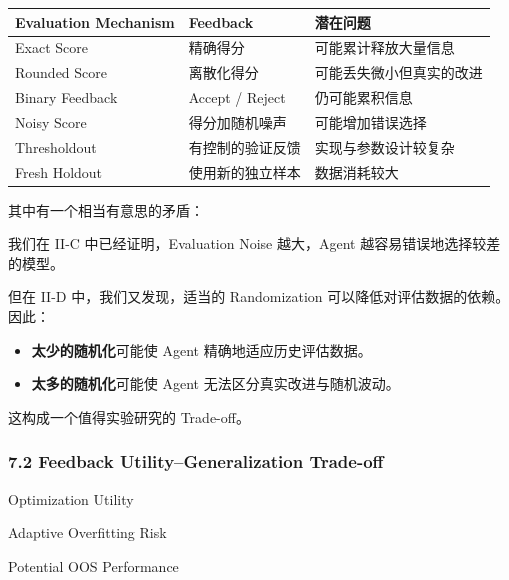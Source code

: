 \begin{readertable}
\begin{longtable}[]{@{}
  >{\raggedright\arraybackslash}p{}
  >{\raggedright\arraybackslash}p{}
  >{\raggedright\arraybackslash}p{}@{}}
\toprule
Evaluation Mechanism & Feedback & 潜在问题 \\
\midrule
\endhead
Exact Score & 精确得分 & 可能累计释放大量信息 \\
Rounded Score & 离散化得分 & 可能丢失微小但真实的改进 \\
Binary Feedback & Accept / Reject & 仍可能累积信息 \\
Noisy Score & 得分加随机噪声 & 可能增加错误选择 \\
Thresholdout & 有控制的验证反馈 & 实现与参数设计较复杂 \\
Fresh Holdout & 使用新的独立样本 & 数据消耗较大 \\
\bottomrule
\end{longtable}
\end{readertable}

其中有一个相当有意思的矛盾：

我们在 II-C 中已经证明，Evaluation Noise 越大，Agent 越容易错误地选择较差的模型。

但在 II-D 中，我们又发现，适当的 Randomization 可以降低对评估数据的依赖。 因此：

\begin{itemize}
\tightlist
\item
  \textbf{太少的随机化}可能使 Agent 精确地适应历史评估数据。
\item
  \textbf{太多的随机化}可能使 Agent 无法区分真实改进与随机波动。
\end{itemize}

这构成一个值得实验研究的 Trade-off。

\hypertarget{part-2-20-0001-feedback-utilitygeneralization-trade-off}{%
\subsubsection{7.2 Feedback Utility--Generalization Trade-off}\label{part-2-20-0001-feedback-utilitygeneralization-trade-off}}


Optimization Utility

Adaptive Overfitting Risk

Potential OOS Performance

